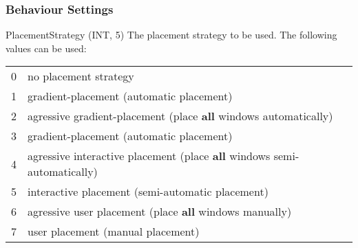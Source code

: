 \documentclass[10pt,a4paper]{article}
\newenvironment{ttdesc}[1]{
   \begin{list}{}{
          \renewcommand{\makelabel}[1]{\texttt{##1\hfill}}}}{\end{list}}
\begin{document}
\subsubsection{Behaviour Settings}
\begin{ttdesc}{description}
\item[PlacementStrategy (INT, 5)] The placement strategy to be used. The
following values can be used:\\[\smallskipamount]
\begin{tabular}{lp{10cm}}
0 & no placement strategy\\
1 & gradient-placement (automatic placement)\\
2 & agressive gradient-placement (place \textbf{all} windows automatically)\\
3 & gradient-placement (automatic placement)\\
4 & agressive interactive placement (place \textbf{all} windows semi-automatically) \\
5 & interactive placement (semi-automatic placement)\\
6 & agressive user placement (place \textbf{all} windows manually)\\
7 & user placement (manual placement)
\end{tabular}


\end{ttdesc}
\end{document}
